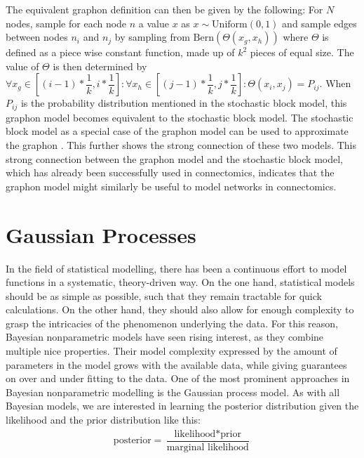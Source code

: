 \documentclass[11pt]{report} %
\begin{document}
The equivalent graphon definition can then be given by the following: 
For $N$ nodes, sample for each node $n$ a value $x$ as $x\sim \text{Uniform}(0,1)$ and sample edges between nodes $n_i$ and $n_j$ by sampling from $\text{Bern}(\Theta(x_g, x_h))$ where $\Theta$ is defined as a piece wise constant function, made up of $k^2$ pieces of equal size. The value of $\Theta$ is then determined by $\forall x_g \in [(i-1)*\dfrac{1}{k},i*\dfrac{1}{k}]: \forall x_h \in [(j-1)*\dfrac{1}{k},j*\dfrac{1}{k}]: \Theta(x_i, x_j)=P_{ij}$. When $P_{ij}$ is the probability distribution mentioned in the stochastic block model, this graphon model becomes equivalent to the stochastic block model. The stochastic block model as a special case of the graphon model can be used to approximate the graphon \cite{airoldi2013,latouche2016,pensky2019,peng2022}. This further shows the strong connection of these two models. 
This strong connection between the graphon model and the stochastic block model, which has already been successfully used in connectomics, indicates that the graphon model might similarly be useful to model networks in connectomics.


    \section{Gaussian Processes}
In the field of statistical modelling, there has been a continuous effort to model functions in a systematic, theory-driven way. On the one hand, statistical models should be as simple as possible, such that they remain tractable for quick calculations. On the other hand, they should also allow for enough complexity to grasp the intricacies of the phenomenon underlying the data. For this reason, Bayesian nonparametric models have seen rising interest, as they combine multiple nice properties. Their model complexity expressed by the amount of parameters in the model grows with the available data, while giving guarantees on over and under fitting to the data. One of the most prominent approaches in Bayesian nonparametric modelling is the Gaussian process model. As with all Bayesian models, we are interested in learning the posterior distribution given the likelihood and the prior distribution like this:
\begin{align}
\label{basicbayes}
\text{posterior} = \dfrac{\text{likelihood} * \text{prior}}{\text{marginal likelihood}}
\end{align}
\end{document}
